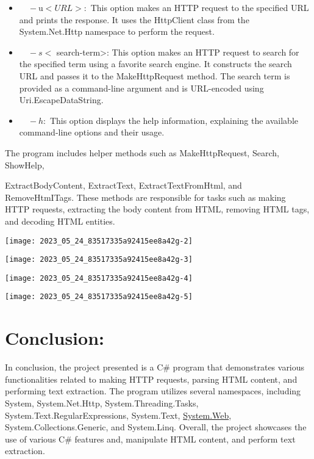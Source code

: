 \documentclass[10pt]{article}
\begin{document}
\begin{itemize}
  \item $\quad-\mathrm{u}<U R L>:$ This option makes an HTTP request to the specified URL and prints the response. It uses the HttpClient class from the System.Net.Http namespace to perform the request.

  \item $\quad-s<$ search-term>: This option makes an HTTP request to search for the specified term using a favorite search engine. It constructs the search URL and passes it to the MakeHttpRequest method. The search term is provided as a command-line argument and is URL-encoded using Uri.EscapeDataString.

  \item $\quad-h:$ This option displays the help information, explaining the available command-line options and their usage.

\end{itemize}

The program includes helper methods such as MakeHttpRequest, Search, ShowHelp,

ExtractBodyContent, ExtractText, ExtractTextFromHtml, and RemoveHtmITags. These methods are responsible for tasks such as making HTTP requests, extracting the body content from HTML, removing HTML tags, and decoding HTML entities.

\begin{center}
\texttt{[image: 2023\_05\_24\_83517335a92415ee8a42g-2]}
\end{center}

\begin{center}
\texttt{[image: 2023\_05\_24\_83517335a92415ee8a42g-3]}
\end{center}

\begin{center}
\texttt{[image: 2023\_05\_24\_83517335a92415ee8a42g-4]}
\end{center}

\begin{center}
\texttt{[image: 2023\_05\_24\_83517335a92415ee8a42g-5]}
\end{center}

\section{Conclusion:}
In conclusion, the project presented is a C\# program that demonstrates various functionalities related to making HTTP requests, parsing HTML content, and performing text extraction. The program utilizes several namespaces, including System, System.Net.Http, System.Threading.Tasks, System.Text.RegularExpressions, System.Text, \href{http://System.Web}{System.Web}, System.Collections.Generic, and System.Linq. Overall, the project showcases the use of various C\# features and, manipulate HTML content, and perform text extraction.
\end{document}
